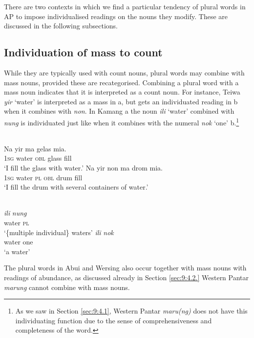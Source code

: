 There are two contexts in which we find a particular tendency of plural words in AP to impose individualised readings on the nouns they modify. These are discussed in the following subsections.

\subsection{Individuation of mass to count}
While they are typically used with count nouns, plural words may combine with mass nouns, provided these are recategorised. Combining a plural word with a mass noun indicates that it is interpreted as a count noun. For instance, Teiwa \textit{yir} `water' is interpreted as a mass in a, but gets an individuated reading in b when it combines with \textit{non}. In Kamang a the noun \textit{ili} `water' combined with \textit{nung} is individuated just like when it combines with the numeral \textit{nok} `one' b.\footnote{ As we saw in Section \ref{sec:9:4.1}, Western Pantar \textit{maru(ng)} does not have this individuating function due to the sense of comprehensiveness and completeness of the word.}


\ea%
\label{ex:9:77}
 \\
\ea
\gll  Na yir ma gelas {mia}{{\textglotstop}}{.} \\
    \textsc{1sg} water \textsc{obl} glass fill \\
\glt `I fill the glass with water.'
\ex
\gll Na yir non ma drom {mia}{{\textglotstop}}{.} \\
   \textsc{1sg} water \textsc{pl} \textsc{obl} drum fill  \\
\glt  `I fill the drum with several containers of water.'
\z
\z







\ea%
\label{ex:9:78}
 \\
\ea
\gll\textit{ili} \textit{nung} \\
   water \textsc{pl} \\
 \glt `\{multiple individual\} waters' 
 \ex 
 \gll \textit{ili} \textit{nok}\\
  water one\\
\glt `a water'
\z
\z

The plural words in Abui and Wersing also occur together with mass nouns with readings of abundance, as discussed already in Section \ref{sec:9:4.2.} Western Pantar \textit{marung} cannot combine with mass nouns.

